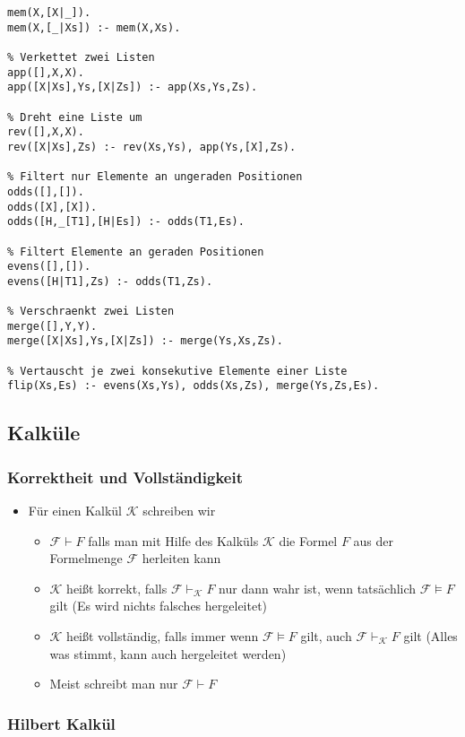 \documentclass{scrartcl}
\begin{document}
\begin{lstlisting}
mem(X,[X|_]).
mem(X,[_|Xs]) :- mem(X,Xs).

% Verkettet zwei Listen
app([],X,X).
app([X|Xs],Ys,[X|Zs]) :- app(Xs,Ys,Zs).

% Dreht eine Liste um
rev([],X,X).
rev([X|Xs],Zs) :- rev(Xs,Ys), app(Ys,[X],Zs).

% Filtert nur Elemente an ungeraden Positionen
odds([],[]).
odds([X],[X]).
odds([H,_[T1],[H|Es]) :- odds(T1,Es).

% Filtert Elemente an geraden Positionen
evens([],[]).
evens([H|T1],Zs) :- odds(T1,Zs).

% Verschraenkt zwei Listen
merge([],Y,Y).
merge([X|Xs],Ys,[X|Zs]) :- merge(Ys,Xs,Zs).

% Vertauscht je zwei konsekutive Elemente einer Liste
flip(Xs,Es) :- evens(Xs,Ys), odds(Xs,Zs), merge(Ys,Zs,Es).
\end{lstlisting}

\subsection{Kalküle}

\subsubsection{Korrektheit und Vollständigkeit}

\begin{itemize}
	\item Für einen Kalkül $\mathcal{K}$ schreiben wir
	\begin{itemize}
		\item $\mathcal{F} \vdash F$ falls man mit Hilfe des Kalküls $\mathcal{K}$ die Formel $F$ aus der Formelmenge $\mathcal{F}$ herleiten kann
		\item $\mathcal{K}$ heißt korrekt, falls $\mathcal{F} \vdash_{\mathcal{K}} F$ nur dann wahr ist, wenn tatsächlich $\mathcal{F} \models F$ gilt (Es wird nichts falsches hergeleitet)
		\item $\mathcal{K}$ heißt vollständig, falls immer wenn $\mathcal{F} \models F$ gilt, auch $\mathcal{F} \vdash_{\mathcal{K}} F$ gilt (Alles was stimmt, kann auch hergeleitet werden)
		\item Meist schreibt man nur $\mathcal{F} \vdash F$
	\end{itemize}
\end{itemize}

\subsubsection{Hilbert Kalkül}
\end{document}
